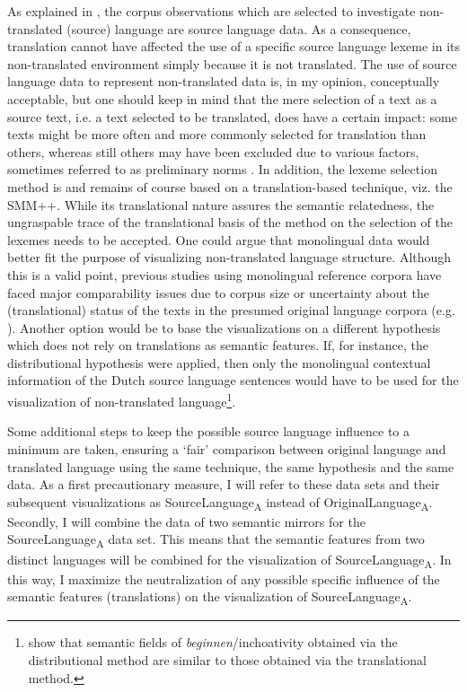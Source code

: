 As explained in , the corpus observations which are selected to investigate non-translated (source) language are source language data. As a consequence, translation cannot have affected the use of a specific source language lexeme in its non-translated environment simply because it is not translated. The use of source language data to represent non-translated data is, in my opinion, conceptually acceptable, but one should keep in mind that the mere selection of a text as a source text, i.e. a text selected to be translated, does have a certain impact: some texts might be more often and more commonly selected for translation than others, whereas still others may have been excluded due to various factors, sometimes referred to as preliminary norms \citep{toury_descriptive_1995}. In addition, the lexeme selection method is and remains of course based on a translation-based technique, viz. the SMM++. While its translational nature assures the semantic relatedness, the ungraspable trace of the translational basis of the method on the selection of the lexemes needs to be accepted. One could argue that monolingual data would better fit the purpose of visualizing non-translated language structure. Although this is a valid point, previous studies using monolingual reference corpora have faced major comparability issues due to corpus size or uncertainty about the (translational) status of the texts in the presumed original language corpora (e.g. \citealt{musolff_conceptual_2014}). Another option would be to base the visualizations on a different hypothesis which does not rely on translations as semantic features. If, for instance, the distributional hypothesis were applied, then only the monolingual contextual information of the Dutch source language sentences would have to be used for the visualization of non-translated language\footnote{\citet{vandevoorde_distributional_2016} show that semantic fields of \textit{beginnen}/inchoativity obtained via the distributional method are similar to those obtained via the translational method.}.



Some additional steps to keep the possible source language influence to a minimum are taken, ensuring a ‘fair’ comparison between original language and translated language using the same technique, the same hypothesis and the same data. As a first precautionary measure, I will refer to these data sets and their subsequent visualizations as SourceLanguage\textsubscript{A} instead of OriginalLanguage\textsubscript{A}. Secondly, I will combine the data of two semantic mirrors for the SourceLanguage\textsubscript{A} data set. This means that the semantic features from two distinct languages will be combined for the visualization of SourceLanguage\textsubscript{A}. In this way, I maximize the neutralization of any possible specific influence of the semantic features (translations) on the visualization of SourceLanguage\textsubscript{A}.


